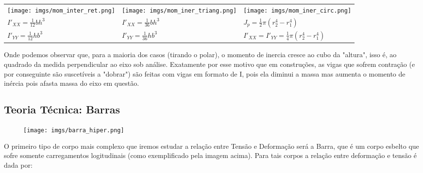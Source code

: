 \documentclass{article}
\begin{document}
\begin{table}[h]
    \begin{tabularx}{\textwidth}{XXX}
        \begin{minipage}{\columnwidth}
            \texttt{[image: imgs/mom\_inter\_ret.png]}
        \end{minipage}   &
        \begin{minipage}{\columnwidth}
            \texttt{[image: imgs/mom\_iner\_triang.png]}
        \end{minipage} &
        \begin{minipage}{\columnwidth}
            \texttt{[image: imgs/mom\_iner\_circ.png]}
        \end{minipage}                                                                                                    \\

        $I'_{XX} = \frac{1}{12}bh^3$                                    & $I'_{XX} = \frac{1}{36}bh^3$ & $J_p = \frac{1}{2} \pi \left(r_2^4 - r_1^4 \right)$            \\
        $I'_{YY} = \frac{1}{12}hb^3$                                    & $I'_{YY}=\frac{1}{36}hb^3$   & $I'_{XX} = I'_{YY} = \frac{1}{4}\pi\left(r_2^4 - r_1^4\right)$
    \end{tabularx}
\end{table}

Onde podemos observar que, para a maioria dos casos (tirando o polar), o momento de inercia cresce ao cubo da "altura", isso é, ao quadrado da medida perpendicular ao eixo sob análise. Exatamente por
esse motivo que em construções, as vigas que sofrem contração (e por conseguinte são suscetíveis a "dobrar") são feitas com vigas em formato de I, pois ela diminui a massa mas aumenta o momento de inércia pois afasta massa do eixo em questão.

\subsection{Teoria Técnica: Barras}
\begin{figure}[h]
    \centering
    \texttt{[image: imgs/barra\_hiper.png]}
\end{figure}


O primeiro tipo de corpo mais complexo que iremos estudar a relação entre Tensão e Deformação será a Barra, que é um corpo esbelto que sofre somente carregamentos logitudinais (como exemplificado pela imagem acima). Para tais corpos a relação entre deformação e tensão é dada por:
\end{document}
